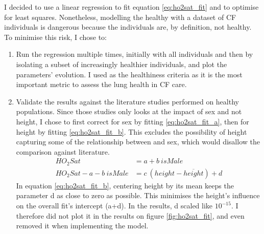 I decided to use a linear regression to fit equation \ref{eq:ho2sat_fit} and to optimise for least squares. Nonetheless, modelling the healthy \OXSat with a dataset of CF individuals is dangerous because the individuals are, by definition, not healthy. To minimise this risk, I chose to:
\begin{enumerate}
    \item Run the regression multiple times, initially with all individuals and then by isolating a subset of increasingly healthier individuals, and plot the parameters' evolution. I used \FPrct as the healthiness criteria as it is the most important metric to assess the lung health in CF care.
    \item Validate the results against the literature studies performed on healthy populations. Since those studies only looks at the impact of sex and not height, I chose to first correct for sex by fitting \ref{eq:ho2sat_fit_a}, then for height by fitting \ref{eq:ho2sat_fit_b}. This excludes the possibility of height capturing some of the relationship between \OXSat and sex, which would disallow the comparison against literature.
        \begin{subequations}
        \begin{align}
          HO_{2}Sat &= a + b\  isMale \label{eq:ho2sat_fit_a}\\
          HO_{2}Sat - a - b\  isMale &= c\ (height - \overline{height}) + d \label{eq:ho2sat_fit_b}
        \end{align}
        \end{subequations}
    In equation \ref{eq:ho2sat_fit_b}, centering height by its mean keeps the parameter d as close to zero as possible. This minimises the height's influence on the overall fit's intercept (a+d). In the results, d scaled like $10^{-15}$. I therefore did not plot it in the results on figure \ref{fig:ho2sat_fit}, and even removed it when implementing the model.
    \end{enumerate}
